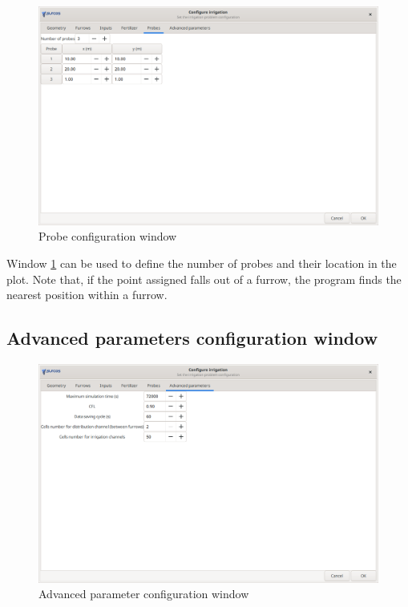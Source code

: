 \begin{figure}[!h]
\begin{center}
\includegraphics*[width=\textwidth]{images/confSondasEN.png}
\qquad
\caption{Probe configuration window}\label{sondas}
\end{center}
\end{figure}

Window \ref{sondas} can be used to define the number of probes and their location in the plot. Note that, if the point assigned falls out of a furrow, the program finds the nearest position within a furrow.

\subsection{Advanced parameters configuration window}

\begin{figure}[!h]
\begin{center}
\includegraphics*[width=\textwidth]{images/confParamEN.png}
\qquad
\caption{Advanced parameter configuration window}\label{param}
\end{center}
\end{figure}

